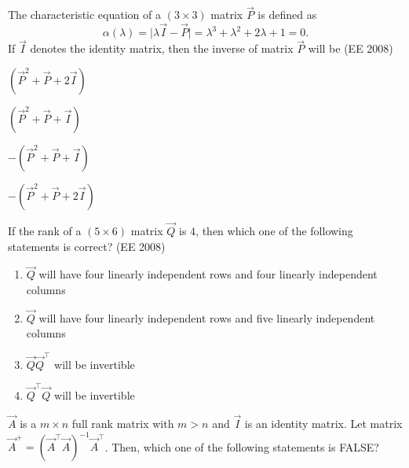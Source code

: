 \item The characteristic equation of a $(3 \times 3)$ matrix $\vec{P}$ is defined as
$$
\alpha(\lambda) = \lvert \lambda \vec{I} - \vec{P} \rvert 
= \lambda^3 + \lambda^2 + 2\lambda + 1 = 0.
$$ %
If $\vec{I}$ denotes the identity matrix, then the inverse of matrix $\vec{P}$ will be
\hfill (EE 2008)
\begin{enumerate}
\begin{multicols}{4}
    \item $(\vec{P}^2 + \vec{P} + 2\vec{I})$
    \item $(\vec{P}^2 + \vec{P} + \vec{I})$
    \item $-(\vec{P}^2 + \vec{P} + \vec{I})$
    \item $-(\vec{P}^2 + \vec{P} + 2\vec{I})$
\end{multicols}
\end{enumerate}
\item If the rank of a $(5 \times 6)$ matrix $\vec{Q}$ is $4$, then which one of the following statements is correct?
\hfill (EE 2008)
\begin{enumerate}
    \item $\vec{Q}$ will have four linearly independent rows and four linearly independent columns
    \item $\vec{Q}$ will have four linearly independent rows and five linearly independent columns
    \item $\vec{Q} \vec{Q}^{\top}$ will be invertible
    \item $\vec{Q}^{\top} \vec{Q}$ will be invertible
\end{enumerate}
\item $\vec{A}$ is a $m \times n$ full rank matrix with $m>n$ and $\vec{I}$ is an identity matrix. Let matrix $\vec{A}^{+}=(\vec{A}^{\top}\vec{A})^{-1}\vec{A}^{\top}$. Then, which one of the following statements is {FALSE}?

